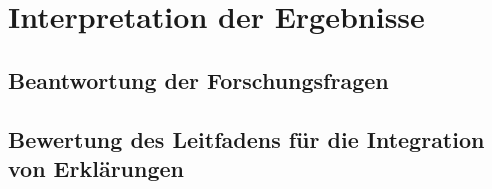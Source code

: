 \section{Interpretation der Ergebnisse}

\subsection*{Beantwortung der Forschungsfragen}

\subsection*{Bewertung des Leitfadens für die Integration von Erklärungen}
